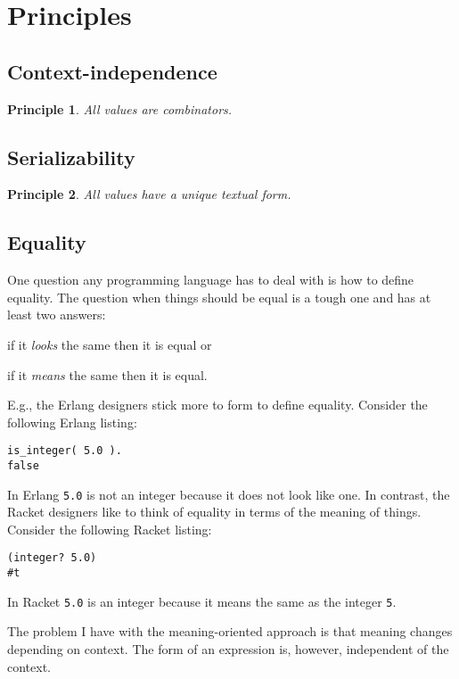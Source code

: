 \documentclass{article}
\newtheorem{principle}{Principle}
\begin{document}
  \section{Principles}


  \subsection{Context-independence}

  \begin{principle}
    All values are combinators.
  \end{principle}


  \subsection{Serializability}


  \begin{principle}
    All values have a unique textual form.
  \end{principle}

  \subsection{Equality}

  One question any programming language has to deal with is how to define equality. The question when things should be equal is a tough one and has at least two answers:
  \begin{inparaenum}[(i)]
  	\item if it \textit{looks} the same then it is equal or
  	\item if it \textit{means} the same then it is equal.
  \end{inparaenum}
  E.g., the Erlang designers stick more to form to define equality. Consider the following Erlang listing:
  \begin{verbatim}
is_integer( 5.0 ).
false
  \end{verbatim}
  In Erlang \texttt{5.0} is not an integer because it does not look like one. In contrast, the Racket designers like to think of equality in terms of the meaning of things. Consider the following Racket listing:
  \begin{verbatim}
(integer? 5.0)
#t
  \end{verbatim}
  In Racket \texttt{5.0} is an integer because it means the same as the integer \texttt{5}.

  The problem I have with the meaning-oriented approach is that meaning changes depending on context. The form of an expression is, however, independent of the context.
\end{document}
